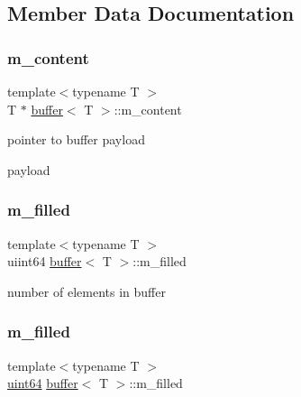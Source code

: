 \subsection{Member Data Documentation}
\mbox{\label{structbuffer_a51dfd20b289c52f084b6d277c2e4745f}} 
\subsubsection{\texorpdfstring{m\+\_\+content}{m\_content}}
{\footnotesize\ttfamily template$<$typename T $>$ \\
T $\ast$ \hyperlink{structbuffer}{buffer}$<$ T $>$\+::m\+\_\+content}



pointer to buffer payload 

payload \mbox{\label{structbuffer_af3dc3d5097b6de42b637942b1b0cf8bc}} 
\subsubsection{\texorpdfstring{m\+\_\+filled}{m\_filled}\hspace{0.1cm}{\footnotesize\ttfamily [1/2]}}
{\footnotesize\ttfamily template$<$typename T $>$ \\
uiint64 \hyperlink{structbuffer}{buffer}$<$ T $>$\+::m\+\_\+filled}



number of elements in buffer 

\mbox{\label{structbuffer_af5e119495e5a739d01f5d1d109aa39b6}} 
\subsubsection{\texorpdfstring{m\+\_\+filled}{m\_filled}\hspace{0.1cm}{\footnotesize\ttfamily [2/2]}}
{\footnotesize\ttfamily template$<$typename T $>$ \\
\hyperlink{types_8h_a60e8696a4678cd348e991a1f172e53f7}{uint64} \hyperlink{structbuffer}{buffer}$<$ T $>$\+::m\+\_\+filled}



